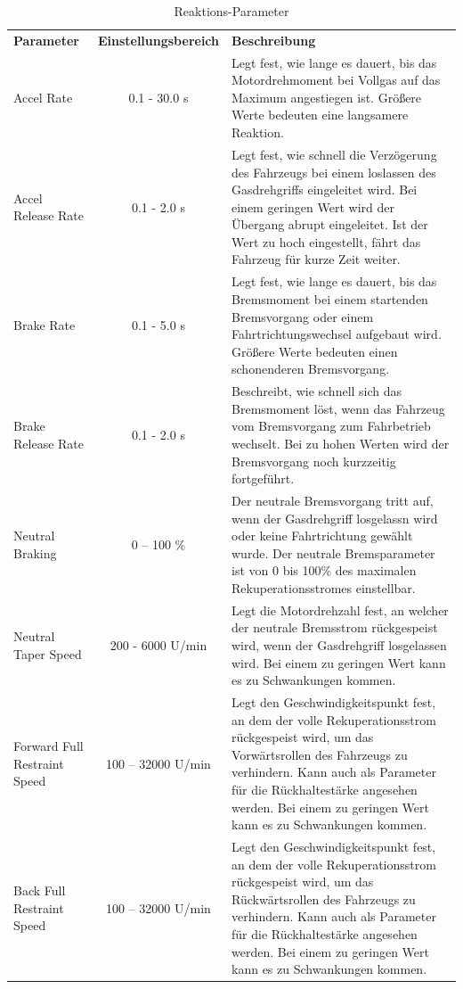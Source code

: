\setlength{\tabcolsep}{6pt}
\begin{table}[H]
	\begin{tabular}{|p{2.5cm}cp{8cm}|}\hline
	\rowcolor[gray]{0.8}\textbf{Parameter} & \textbf{Einstellungsbereich} &\textbf{Beschreibung}\\[2pt]
		Accel Rate 						& 0.1 - 30.0 s 		& Legt fest, wie lange es dauert, bis das Motordrehmoment bei Vollgas auf das Maximum angestiegen ist. Größere Werte bedeuten eine langsamere Reaktion. \\\hline
		Accel Release Rate				& 0.1 - 2.0 s 	 	&  Legt fest, wie schnell die Verzögerung des Fahrzeugs bei einem loslassen des Gasdrehgriffs eingeleitet wird. Bei einem geringen Wert wird der Übergang abrupt eingeleitet. Ist der Wert zu hoch eingestellt, fährt das Fahrzeug für kurze Zeit weiter.\\\hline
		Brake Rate 						& 0.1 - 5.0 s 	 	& Legt fest, wie lange es dauert, bis das Bremsmoment bei einem startenden Bremsvorgang oder einem Fahrtrichtungswechsel aufgebaut wird. Größere Werte bedeuten einen schonenderen Bremsvorgang. \\\hline
		Brake Release Rate				& 0.1 - 2.0 s 	 	& Beschreibt, wie schnell sich das Bremsmoment löst, wenn das Fahrzeug vom Bremsvorgang zum Fahrbetrieb wechselt. Bei zu hohen Werten wird der Bremsvorgang noch kurzzeitig fortgeführt.  \\\hline
		Neutral Braking    				& 0 – 100 \% 		& Der neutrale Bremsvorgang tritt auf, wenn der Gasdrehgriff losgelassn wird oder keine Fahrtrichtung gewählt wurde. Der neutrale Bremsparameter ist von 0 bis 100\% des maximalen Rekuperationsstromes einstellbar. \\\hline
		Neutral Taper Speed    			& 200 - 6000 U/min 	& Legt die Motordrehzahl fest, an welcher der neutrale Bremsstrom rückgespeist wird, wenn der Gasdrehgriff losgelassen wird. Bei einem zu geringen Wert kann es zu Schwankungen kommen.\\\hline
		Forward Full Restraint Speed	& 100 – 32000 U/min & Legt den Geschwindigkeitspunkt fest, an dem der volle Rekuperationsstrom rückgespeist wird, um das Vorwärtsrollen des Fahrzeugs zu verhindern. Kann auch als Parameter für die Rückhaltestärke angesehen werden. Bei einem zu geringen Wert kann es zu Schwankungen kommen.  \\\hline
		Back Full Restraint Speed    	& 100 – 32000 U/min & Legt den Geschwindigkeitspunkt fest, an dem der volle Rekuperationsstrom rückgespeist wird, um das Rückwärtsrollen des Fahrzeugs zu verhindern. Kann auch als Parameter für die Rückhaltestärke angesehen werden. Bei einem zu geringen Wert kann es zu Schwankungen kommen. \\\hline		
	\end{tabular}	
	\caption{Reaktions-Parameter}
	\label{tab:Reaktions-Parameter}
\end{table}



